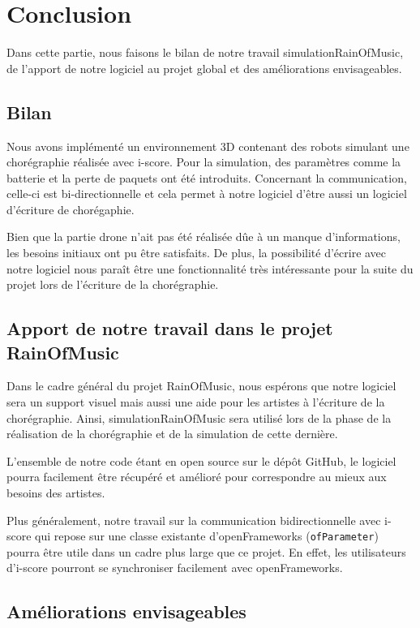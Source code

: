 \section{Conclusion}

Dans cette partie, nous faisons le bilan de notre travail simulationRainOfMusic, de l'apport de notre logiciel au projet global et des améliorations envisageables.

\subsection{Bilan}

Nous avons implémenté un environnement 3D contenant des robots simulant une chorégraphie réalisée avec i-score. Pour la simulation, des paramètres comme la batterie et la perte de paquets ont été introduits. Concernant la communication, celle-ci est bi-directionnelle et cela permet à notre logiciel d'être aussi un logiciel d'écriture de chorégaphie. 

Bien que la partie drone n'ait pas été réalisée dûe à un manque d'informations, les besoins initiaux ont pu être satisfaits. De plus, la possibilité d'écrire avec notre logiciel nous paraît être une fonctionnalité très intéressante pour la suite du projet lors de l'écriture de la chorégraphie.

\subsection{Apport de notre travail dans le projet RainOfMusic}

Dans le cadre général du projet RainOfMusic, nous espérons que notre logiciel sera un support visuel mais aussi une aide pour les artistes à l'écriture de la chorégraphie. Ainsi, simulationRainOfMusic sera utilisé lors de la phase de la réalisation de la chorégraphie et de la simulation de cette dernière. 

L'ensemble de notre code étant en open source sur le dépôt GitHub, le logiciel pourra facilement être récupéré et amélioré pour correspondre au mieux aux besoins des artistes. 

Plus généralement, notre travail sur la communication bidirectionnelle avec i-score qui repose sur une classe existante d'openFrameworks (\verb|ofParameter|) pourra être utile dans un cadre plus large que ce projet. En effet, les utilisateurs d'i-score pourront se synchroniser facilement avec openFrameworks.

\subsection{Améliorations envisageables}

